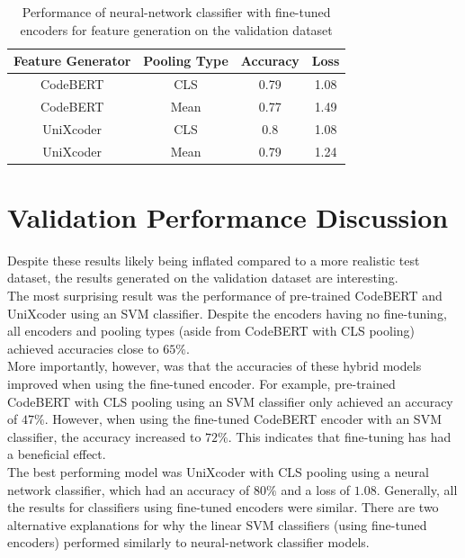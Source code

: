 \begin{table}[H]
    \caption{Performance of neural-network classifier with fine-tuned encoders for feature generation on the validation dataset}
    \label{tab:validation_perfomance_fine_nn}
    \begin{center}
        \begin{tabular}{c|c|c|c}
            \textbf{Feature Generator} & \textbf{Pooling Type} & \textbf{Accuracy} & \textbf{Loss} \\
            \hline
            CodeBERT & CLS & 0.79 & 1.08 \\
            CodeBERT & Mean &  0.77 & 1.49\\
            UniXcoder & CLS & 0.8 & 1.08 \\
            UniXcoder & Mean & 0.79 & 1.24 \\
        \end{tabular}
    \end{center}
\end{table}

\section{Validation Performance Discussion}
\label{validation_discussion}

\noindent
Despite these results likely being inflated compared to a more realistic test dataset, the results generated on the validation dataset are interesting. \\

\noindent
The most surprising result was the performance of pre-trained CodeBERT and UniXcoder using an SVM classifier. Despite the encoders having no fine-tuning, all encoders and pooling types (aside from CodeBERT with CLS pooling) achieved accuracies close to $65\%$. \\

\noindent
More importantly, however, was that the accuracies of these hybrid models improved when using the fine-tuned encoder. For example, pre-trained CodeBERT with CLS pooling using an SVM classifier only achieved an accuracy of $47\%$. However, when using the fine-tuned CodeBERT encoder with an SVM classifier, the accuracy increased to $72\%$. This indicates that fine-tuning has had a beneficial effect. \\

\noindent
The best performing model was UniXcoder with CLS pooling using a neural network classifier, which had an accuracy of $80\%$ and a loss of $1.08$. Generally, all the results for classifiers using fine-tuned encoders were similar. There are two alternative explanations for why the linear SVM classifiers (using fine-tuned encoders) performed similarly to neural-network classifier models.\\

